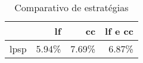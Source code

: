 
\begin{table}[ht]
	\centering
	\caption{Comparativo de estratégias}\label{tbl:comp}
	\begin{tabular}{lrrr}
		\hline
		                & \acrshort{lf}   & \acrshort{cc} &  \acrshort{lf} e \acrshort{cc} \\
		\hline
		\hline
		\acrshort{lpsp} &  5.94\%         &  7.69\%       &  6.87\%                        \\
		\hline
	\end{tabular}
\end{table}
